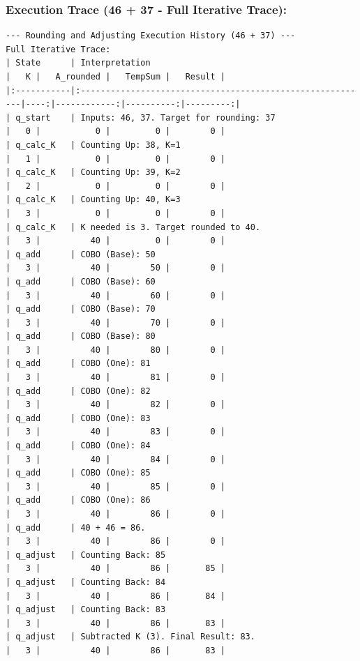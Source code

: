 \documentclass[11pt]{article}
\begin{document}
\subsubsection*{Execution Trace (46 + 37 - Full Iterative Trace):}
\begin{verbatim}
--- Rounding and Adjusting Execution History (46 + 37) ---
Full Iterative Trace:
| State      | Interpretation                                            |   K |   A_rounded |   TempSum |   Result |
|:-----------|:----------------------------------------------------------|----:|------------:|----------:|---------:|
| q_start    | Inputs: 46, 37. Target for rounding: 37                   |   0 |           0 |         0 |        0 |
| q_calc_K   | Counting Up: 38, K=1                                      |   1 |           0 |         0 |        0 |
| q_calc_K   | Counting Up: 39, K=2                                      |   2 |           0 |         0 |        0 |
| q_calc_K   | Counting Up: 40, K=3                                      |   3 |           0 |         0 |        0 |
| q_calc_K   | K needed is 3. Target rounded to 40.                      |   3 |          40 |         0 |        0 |
| q_add      | COBO (Base): 50                                           |   3 |          40 |        50 |        0 |
| q_add      | COBO (Base): 60                                           |   3 |          40 |        60 |        0 |
| q_add      | COBO (Base): 70                                           |   3 |          40 |        70 |        0 |
| q_add      | COBO (Base): 80                                           |   3 |          40 |        80 |        0 |
| q_add      | COBO (One): 81                                            |   3 |          40 |        81 |        0 |
| q_add      | COBO (One): 82                                            |   3 |          40 |        82 |        0 |
| q_add      | COBO (One): 83                                            |   3 |          40 |        83 |        0 |
| q_add      | COBO (One): 84                                            |   3 |          40 |        84 |        0 |
| q_add      | COBO (One): 85                                            |   3 |          40 |        85 |        0 |
| q_add      | COBO (One): 86                                            |   3 |          40 |        86 |        0 |
| q_add      | 40 + 46 = 86.                                             |   3 |          40 |        86 |        0 |
| q_adjust   | Counting Back: 85                                         |   3 |          40 |        86 |       85 |
| q_adjust   | Counting Back: 84                                         |   3 |          40 |        86 |       84 |
| q_adjust   | Counting Back: 83                                         |   3 |          40 |        86 |       83 |
| q_adjust   | Subtracted K (3). Final Result: 83.                       |   3 |          40 |        86 |       83 |
\end{verbatim}

\printbibliography
\end{document}
